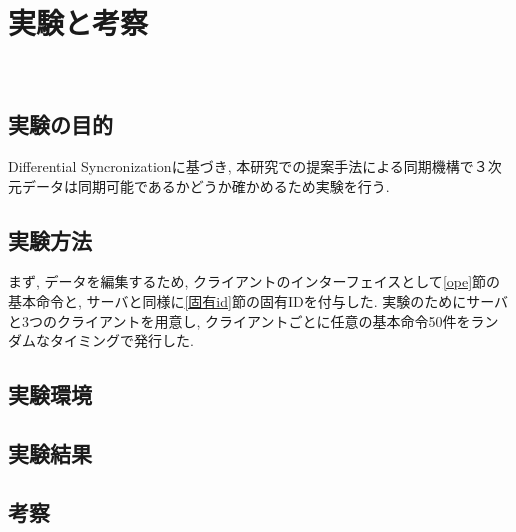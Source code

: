\chapter{実験と考察}　\label{chap:test}
\section{実験の目的}
Differential Syncronizationに基づき, 本研究での提案手法による同期機構で３次元データは同期可能であるかどうか確かめるため実験を行う.
\section{実験方法}
まず, データを編集するため, クライアントのインターフェイスとして\ref{ope}節の基本命令と, サーバと同様に\ref{固有id}節の固有IDを付与した.
実験のためにサーバと3つのクライアントを用意し, クライアントごとに任意の基本命令50件をランダムなタイミングで発行した.
\section{実験環境}

\section{実験結果}
\section{考察}
